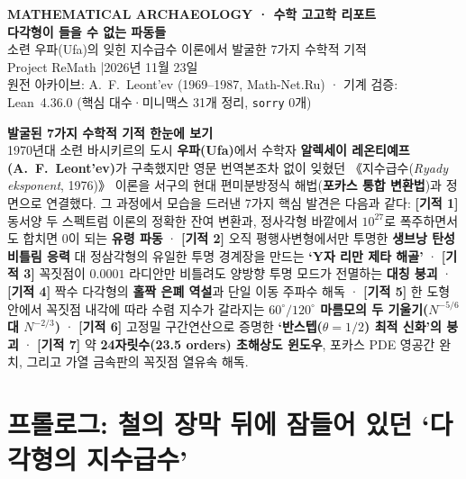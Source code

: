 \documentclass[11pt,a4paper]{article}
\begin{document}
\begin{center}
  {\sffamily\footnotesize\bfseries\color{teal} MATHEMATICAL ARCHAEOLOGY · 수학 고고학 리포트}\\[0.55em]
  {\sffamily\huge\bfseries\color{navy} 다각형이 들을 수 없는 파동들}\\[0.4em]
  {\sffamily\large\color{darkgray} 소련 우파(Ufa)의 잊힌 지수급수 이론에서 발굴한 7가지 수학적 기적}\\[0.9em]
  {\sffamily\small Project ReMath \quad|\quad 2026년 11월 23일}\\[0.25em]
  {\footnotesize\color{gray} 원전 아카이브: A.~F.~Leont'ev (1969–1987, Math-Net.Ru) · 기계 검증: Lean~4.36.0 (핵심 대수·미니맥스 31개 정리, \texttt{sorry} 0개)}
\end{center}

\vspace{0.4em}

\begin{tcolorbox}[colback=softbg,colframe=navy,boxrule=0.7pt,arc=3pt,left=12pt,right=12pt,top=8pt,bottom=8pt]
\textbf{\sffamily 발굴된 7가지 수학적 기적 한눈에 보기}\\[0.25em]
1970년대 소련 바시키르의 도시 \textbf{우파(Ufa)}에서 수학자 \textbf{알렉세이 레온티예프(A.~F.~Leont'ev)}가 구축했지만 영문 번역본조차 없이 잊혔던 《지수급수(\textit{Ryady eksponent}, 1976)》 이론을 서구의 현대 편미분방정식 해법(\textbf{포카스 통합 변환법})과 정면으로 연결했다. 그 과정에서 모습을 드러낸 7가지 핵심 발견은 다음과 같다:
\textbf{[기적 1]} 동서양 두 스펙트럼 이론의 정확한 잔여 변환과, 정사각형 바깥에서 $10^{27}$로 폭주하면서도 합치면 $0$이 되는 \textbf{유령 파동} ·
\textbf{[기적 2]} 오직 평행사변형에서만 투명한 \textbf{생브낭 탄성 비틀림 응력} 대 정삼각형의 유일한 투명 경계장을 만드는 \textbf{`Y자 리만 제타 해골'} ·
\textbf{[기적 3]} 꼭짓점이 $0.0001$ 라디안만 비틀려도 양방향 투명 모드가 전멸하는 \textbf{대칭 붕괴} ·
\textbf{[기적 4]} 짝수 다각형의 \textbf{홀짝 은폐 역설}과 단일 이동 주파수 해독 ·
\textbf{[기적 5]} 한 도형 안에서 꼭짓점 내각에 따라 수렴 지수가 갈라지는 \textbf{$60^\circ/120^\circ$ 마름모의 두 기울기($N^{-5/6}$ 대 $N^{-2/3}$)} ·
\textbf{[기적 6]} 고정밀 구간연산으로 증명한 \textbf{`반스텝($\theta=1/2$) 최적 신화'의 붕괴} ·
\textbf{[기적 7]} 약 \textbf{24자릿수(23.5 orders) 초해상도 윈도우}, 포카스 PDE 영공간 완치, 그리고 가열 금속판의 꼭짓점 열유속 해독.
\end{tcolorbox}

\section{프롤로그: 철의 장막 뒤에 잠들어 있던 `다각형의 지수급수'}
\end{document}
